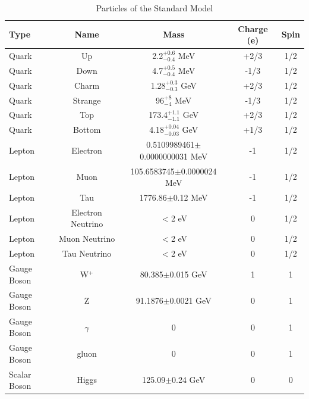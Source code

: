 \begin{table}
  \centering
  \begin{tabular}{l c c c c}
    \toprule
    Type  & Name & Mass & Charge (e) & Spin  \\
    \midrule
    Quark & Up & 2.2$^{+ 0.6}_{-0.4}$ MeV & +2/3 & 1/2 \\
    Quark & Down & 4.7$^{+ 0.5}_{-0.4}$ MeV &  -1/3 & 1/2 \\
    \midrule
    Quark & Charm & 1.28$^{+ 0.3}_{-0.3}$ GeV& +2/3 & 1/2 \\
    Quark & Strange & 96$^{+ 8}_{-4}$ MeV& -1/3 & 1/2 \\
    \midrule
    Quark & Top & 173.4$^{+ 1.1}_{-1.1}$ GeV & +2/3 & 1/2 \\
    Quark & Bottom & 4.18$^{+ 0.04}_{-0.03}$ GeV& +1/3 & 1/2 \\
    \midrule
    \midrule
    Lepton & Electron & 0.5109989461$\pm$0.0000000031 MeV & -1 & 1/2 \\
    Lepton & Muon & 105.6583745$\pm$0.0000024 MeV& -1 & 1/2 \\
    Lepton & Tau & 1776.86$\pm$0.12 MeV & -1 & 1/2 \\
    \midrule
    Lepton & Electron Neutrino & $<$2 eV & 0 & 1/2 \\
    Lepton & Muon Neutrino & $<$2 eV & 0 & 1/2 \\
    Lepton & Tau Neutrino & $<$2 eV & 0 & 1/2 \\
    \midrule
    \midrule
    Gauge Boson & W$^+$ & 80.385$\pm$0.015 GeV& 1 & 1 \\
    Gauge Boson & Z & 91.1876$\pm$0.0021 GeV & 0 & 1 \\
    Gauge Boson & $\gamma$ & 0 & 0 & 1 \\
    Gauge Boson & gluon & 0 & 0 & 1 \\
    \midrule
    \midrule
    Scalar Boson & Higgs & 125.09$\pm$0.24 GeV & 0 & 0 \\
    \bottomrule
  \end{tabular}
  \caption[Particles of the Standard Model]{Particles of the Standard Model \cite{Patrignani:2016xqp}}
  \label{tab:smparticles}
\end{table}

